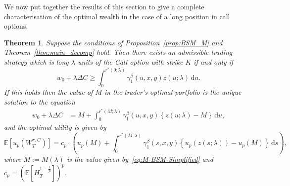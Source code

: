 \documentclass[a4paper]{amsart}
\newtheorem{theorem}{Theorem}[section]
\theoremstyle{definition}
\theoremstyle{remark}
\numberwithin{equation}{section}
\newcommand{\E}{\mathbb{E}}
\newcommand{\Q}{\mathbb{Q}}
\newcommand{\di}{\mathrm{d}}
\newcommand{\half}{\dfrac{1}{2}}
\newcommand{\Ep}[1]{\E\left[#1\right]}
\newcommand{\comment}[1]{{\color{red} \bf #1}}
\newcommand{\ol}{\overline}
\newcommand{\bQ}{\ol{\mathbb{Q}}}
\begin{document}

We now put together the results of this section to give a complete characterisation of the optimal wealth in the case of a long position in call options.

\begin{theorem}
  Suppose the conditions of Proposition~\ref{prop:BSM_M} and Theorem~\ref{thm:main_decomp} hold.
  Then there exists an admissible trading strategy which is long $\lambda$ units of the Call option with strike $K$ if and only if
  \[
    w_0 + \lambda \Delta C  \ge \int_0^{r^*(0;\lambda)} \gamma_1^\beta(u,x,y)  z(u; \lambda) \, \di u.
  \]
  If this holds then the value of $M$ in the trader's optimal portfolio is the unique solution to the equation
  \begin{align}
    w_0 + \lambda \Delta C & = M + \int _0^{r^*(M;\lambda)} \gamma_1^\beta(u,x,y) \left\{z(u;\lambda)-M\right\} \, \di u, \label{eq:M-BSM-Simplified}
  \end{align}
  and the optimal utility is given by
  \begin{equation*}
     \Ep{u_p(W_T^{\pi,C})} = c_p \cdot \left( u_p(M) + \int _0^{r^*(M;\lambda)} \gamma_1^\beta(s,x,y) \left\{u_p(z(s;\lambda))-u_p(M)\right\} \, \di s\right),
  \end{equation*}
  where $M:= M(\lambda)$ is the value given by~\eqref{eq:M-BSM-Simplified} and $c_p = \left(\Ep{H_T^{1-\frac{1}{p}}}\right)^{p}$.

\end{theorem}


\end{document}
